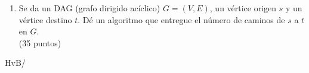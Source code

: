 \documentclass[english, spanish, fleqn]{article}
\theoremstyle{plain}
\begin{document}
\begin{enumerate}
    pero con la restricción que toda movida debe involucrar la aguja \(B\)
    (por ejemplo,
     no podemos simplemente mover el disco mayor de \(A\) a \(C\),
     debemos pasar por \(B\)).
    \begin{enumerate}
    \item %
      Plantee una técnica
      (algoritmo)
      para resolver esta variante.
    \item %
      Halle una recurrencia para el número de platos movidos
      por su algoritmo en términos de \(n\).
    \end{enumerate}
    \hspace*{\fill}(35 puntos)
  \item %
    Se da un DAG
    (grafo dirigido acíclico)
    \(G = (V, E)\),
    un vértice origen \(s\)
    y un vértice destino \(t\).
    Dé un algoritmo
    que entregue el número de caminos de \(s\) a \(t\) en \(G\).
    \\ \hspace*{\fill}(35 puntos)
  \end{enumerate}
  \vspace*{\fill}\hspace*{\fill}HvB/\LaTeXe
\end{document}

